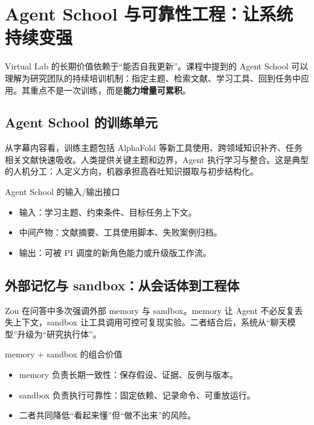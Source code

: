 \section{Agent School 与可靠性工程：让系统持续变强}

Virtual Lab 的长期价值依赖于``能否自我更新''。课程中提到的 Agent School 可以理解为研究团队的持续培训机制：指定主题、检索文献、学习工具、回到任务中应用。其重点不是一次训练，而是\textbf{能力增量可累积}。

\subsection{Agent School 的训练单元}

从字幕内容看，训练主题包括 AlphaFold 等新工具使用、跨领域知识补齐、任务相关文献快速吸收。人类提供关键主题和边界，Agent 执行学习与整合。这是典型的人机分工：人定义方向，机器承担高吞吐知识摄取与初步结构化。

\begin{knowledgebox}{Agent School 的输入/输出接口}
\begin{itemize}
    \item 输入：学习主题、约束条件、目标任务上下文。
    \item 中间产物：文献摘要、工具使用脚本、失败案例归档。
    \item 输出：可被 PI 调度的新角色能力或升级版工作流。
\end{itemize}
\end{knowledgebox}

\subsection{外部记忆与 sandbox：从会话体到工程体}

Zou 在问答中多次强调外部 memory 与 sandbox。memory 让 Agent 不必反复丢失上下文，sandbox 让工具调用可控可复现实验。二者结合后，系统从``聊天模型''升级为``研究执行体''。

\begin{importantbox}{memory + sandbox 的组合价值}
\begin{itemize}
    \item memory 负责长期一致性：保存假设、证据、反例与版本。
    \item sandbox 负责执行可靠性：固定依赖、记录命令、可重放运行。
    \item 二者共同降低``看起来懂''但``做不出来''的风险。
\end{itemize}
\end{importantbox}

